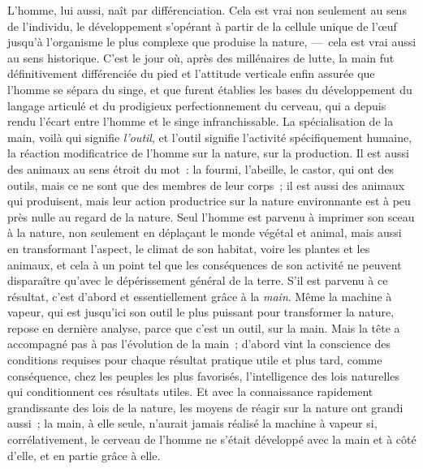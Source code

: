 \documentclass[french,twoside]{book} %
\begin{document}
\noindent L’homme, lui aussi, naît par différenciation. Cela est vrai non seulement au sens de l’individu, le développement s’opérant à partir de la cellule unique de l’œuf jusqu’à l’organisme le plus complexe que produise la nature, — cela est vrai aussi au sens historique. C’est le jour où, après des millénaires de lutte, la main fut définitivement différenciée du pied et l’attitude verticale enfin assurée que l’homme se sépara du singe, et que furent établies les bases du développement du langage articulé et du prodigieux perfectionnement du cerveau, qui a depuis rendu l’écart entre l’homme et le singe infranchissable. La spécialisation de la main, voilà qui signifie \emph{l’outil}, et l’outil signifie l’activité spécifiquement humaine, la réaction modificatrice de l’homme sur la nature, sur la production. Il est aussi des animaux au sens étroit du mot : la fourmi, l’abeille, le castor, qui ont des outils, mais ce ne sont que des membres de leur corps ; il est aussi des animaux qui produisent, mais leur action productrice sur la nature environnante est à peu près nulle au regard de la nature. Seul l’homme est parvenu à imprimer son sceau à la nature, non seulement en déplaçant le monde végétal et animal, mais aussi en transformant l’aspect, le climat de son habitat, voire les plantes et les animaux, et cela à un point tel que les conséquences de son activité ne peuvent disparaître qu’avec le dépérissement général de la terre. S’il est parvenu à ce résultat, c’est d’abord et essentiellement grâce à la \emph{main}. Même la machine à vapeur, qui est jusqu’ici son outil le plus puissant pour transformer la nature, repose en dernière analyse, parce que c’est un outil, sur la main. Mais la tête a accompagné pas à pas l’évolution de la main ; d’abord vint la conscience des conditions requises pour chaque résultat pratique utile et plus tard, comme conséquence, chez les peuples les plus favorisés, l’intelligence des lois naturelles qui conditionnent ces résultats utiles. Et avec la connaissance rapidement grandissante des lois de la nature, les moyens de réagir sur la nature ont grandi aussi ; la main, à elle seule, n’aurait jamais réalisé la machine à vapeur si, corrélativement, le cerveau de l’homme ne s’était développé avec la main et à côté d’elle, et en partie grâce à elle.\par
\end{document}
